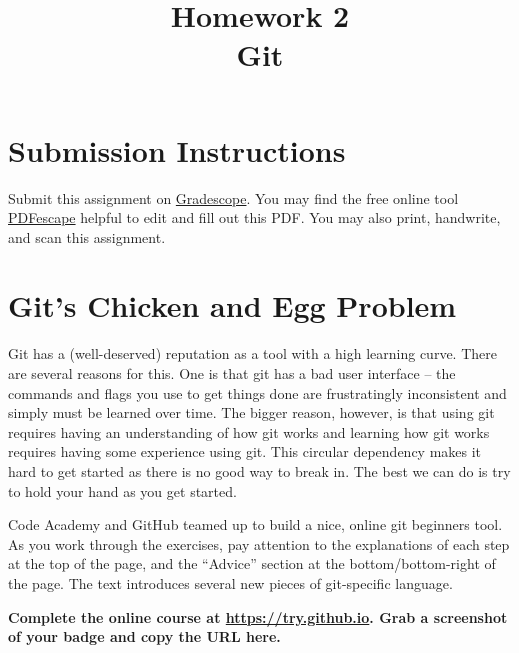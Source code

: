 \documentclass{article}
\begin{document}
\fancyhead[L]{}
\fancyhead[R]{}

\fancyfoot[C]{\thepage~/~\pageref*{LastPage}}
\pagestyle{fancyplain}


\title{\textbf{Homework 2\\Git}}
\author{\textbf{\color{red}{Due: Saturday, January 21, 10:00PM (Hard Deadline)}}}
\date{}
\maketitle


\section*{Submission Instructions}
Submit this assignment on \href{https://gradescope.com/courses/5574}{Gradescope}.
You may find the free online tool \href{https://www.pdfescape.com}{PDFescape}
helpful to edit and fill out this PDF.
You may also print, handwrite, and scan this assignment.

\section{Git's Chicken and Egg Problem}

Git has a (well-deserved) reputation as a tool with a high learning curve.
There are several reasons for this. One is that git has a bad user interface
-- the commands and flags you use to get things done are frustratingly
inconsistent and simply must be learned over time.
The bigger reason, however, is that using git requires having an understanding
of how git works and learning how git works requires having some experience
using git. This circular dependency makes it hard to get started as there is
no good way to break in. The best we can do is try to hold your hand as you
get started.

\medskip
\noindent
Code Academy and GitHub teamed up to build a nice, online git beginners tool.
As you work through the exercises, pay attention to the explanations of each
step at the top of the page, and the ``Advice'' section at the
bottom/bottom-right of the page. The text introduces several new pieces of
git-specific language.

\medskip
\noindent
\textbf{Complete the online course at \url{https://try.github.io}. Grab a
  screenshot of your badge and copy the URL here.
  \color{red}{\small (You will need to sign in or create an account get your badge)}
}
\end{document}
